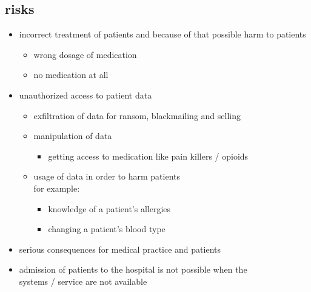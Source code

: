 \documentclass[12pt]{article}
\begin{document}
\subsection{risks}
\begin{itemize}
    \item incorrect treatment of patients and because of that possible harm to patients
    \begin{itemize}
        \item wrong dosage of medication
        \item no medication at all
    \end{itemize}
     \item unauthorized access to patient data 
    \begin{itemize}
        \item exfiltration of data for ransom, blackmailing and selling
        \item manipulation of data
        \begin{itemize}
            \item getting access to medication like pain killers / opioids
        \end{itemize}
        \item usage of data in order to harm patients\\ for example:
        \begin{itemize}
            \item knowledge of a patient's allergies
            \item changing a patient's blood type
        \end{itemize}
    \end{itemize}
    \item serious consequences for medical practice and patients
    \item admission of patients to the hospital is not possible when the \\systems / service are not available
\end{itemize}

\newpage
\end{document}
